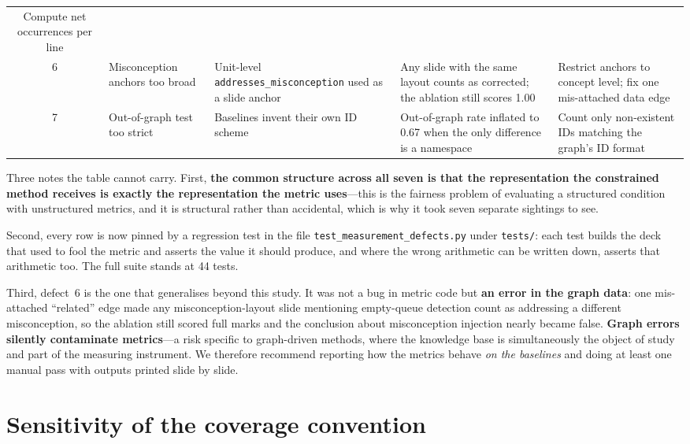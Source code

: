 \documentclass[11pt,a4paper]{article}
\newcommand{\id}[1]{\texttt{#1}}
\begin{document}
\begin{table}[htbp]
\begin{tabularx}{\textwidth}{@{}cL{2.5cm}L{3.4cm}L{3.5cm}X@{}}
Compute net occurrences per line \\
6 & Misconception anchors too broad &
Unit-level \id{addresses\_\allowbreak misconception} used as a slide anchor &
Any slide with the same layout counts as corrected; the ablation still scores
1.00 & Restrict anchors to concept level; fix one mis-attached data edge \\
7 & Out-of-graph test too strict & Baselines invent their own ID scheme &
Out-of-graph rate inflated to 0.67 when the only difference is a namespace &
Count only non-existent IDs matching the graph's ID format \\
\bottomrule
\end{tabularx}
\end{table}

Three notes the table cannot carry. First, \textbf{the common structure across
all seven is that the representation the constrained method receives is exactly
the representation the metric uses}---this is the fairness problem of evaluating
a structured condition with unstructured metrics, and it is structural rather
than accidental, which is why it took seven separate sightings to see.

Second, every row is now pinned by a regression test in the file
\id{test\_measurement\_defects.py} under \id{tests/}: each test builds the deck
that used to fool the metric and asserts the value it should produce, and where
the wrong arithmetic can be written down, asserts that arithmetic too. The full
suite stands at 44 tests.

Third, defect~6 is the one that generalises beyond this study. It was not a bug
in metric code but \textbf{an error in the graph data}: one mis-attached
``related'' edge made any misconception-layout slide mentioning empty-queue
detection count as addressing a different misconception, so the ablation still
scored full marks and the conclusion about misconception injection nearly became
false. \textbf{Graph errors silently contaminate metrics}---a risk specific to
graph-driven methods, where the knowledge base is simultaneously the object of
study and part of the measuring instrument. We therefore recommend reporting how
the metrics behave \emph{on the baselines} and doing at least one manual pass
with outputs printed slide by slide.

\section{Sensitivity of the coverage convention}
\label{sec:s-coverage}
\end{document}
